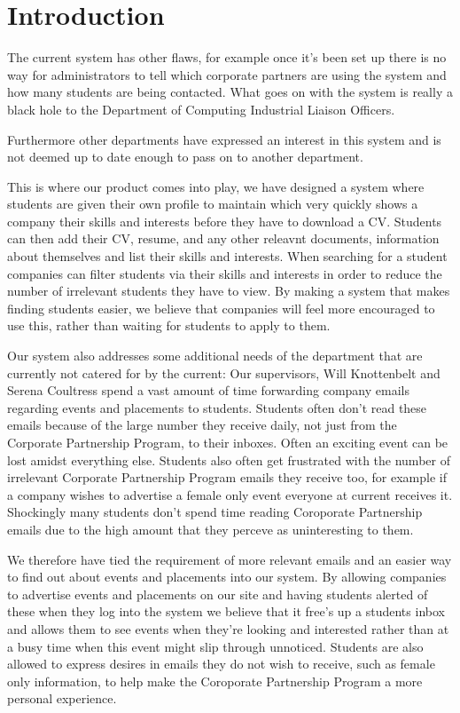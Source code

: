 \section{Introduction}


The current system has other flaws, for example once it's been set up there is no way for administrators to tell which corporate partners are using the system and how many students are being contacted. What goes on with the system is really a black hole to the Department of Computing Industrial Liaison Officers. 

Furthermore other departments have expressed an interest in this system and is not deemed up to date enough to pass on to another department.

This is where our product comes into play, we have designed a system where students are given their own profile to maintain which very quickly shows a company their skills and interests before they have to download a CV. Students can then add their CV, resume, and any other releavnt documents, information about themselves and list their skills and interests.
When searching for a student companies can filter students via their skills and interests in order to reduce the number of irrelevant students they have to view. By making a system that makes finding students easier, we believe that companies will feel more encouraged to use this, rather than waiting 
for students to apply to them.

Our system also addresses some additional needs of the department that are currently not catered for by the current:
Our supervisors, Will Knottenbelt and Serena Coultress spend a vast amount of time forwarding company emails regarding events and placements to students.
Students often don't read these emails because of the large number they receive daily, not just from the Corporate Partnership Program, to their inboxes. Often an exciting event can be lost amidst everything else. Students also often get frustrated with the number of irrelevant Corporate Partnership Program emails they receive too, for example if a company wishes to advertise a female only event everyone at current receives it.
Shockingly many students don't spend time reading Coroporate Partnership emails due to the high amount that they perceve as uninteresting to them.

We therefore have tied the requirement of more relevant emails and an easier way to find out about events and placements into our system. By allowing companies to advertise events and placements on our site and having students alerted of these when they log into the system we believe that it free's
up a students inbox and allows them to see events when they're looking and interested rather than at a busy time when this event might slip through
unnoticed.
Students are also allowed to express desires in emails they do not wish to receive, such as female only information, to help make the Coroporate Partnership Program a more personal experience. 


